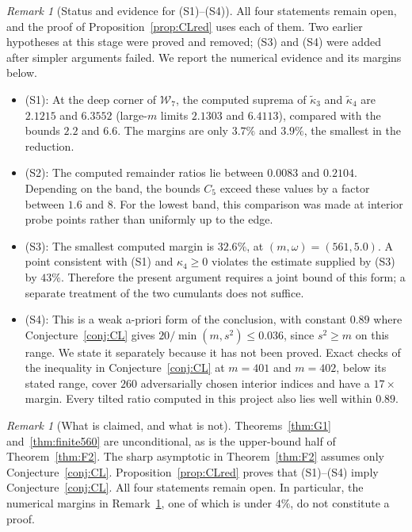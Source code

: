 \documentclass[11pt]{amsart}
\theoremstyle{plain}
\theoremstyle{definition}
\theoremstyle{remark}
\newtheorem{remark}[theorem]{Remark}
\begin{document}
\begin{remark}[Status and evidence for (S1)--(S4)]
\label{rem:S-evidence}
All four statements remain open, and the proof of
Proposition~\ref{prop:CLred} uses each of them. Two earlier hypotheses at
this stage were proved and removed; (S3) and (S4) were added after simpler
arguments failed. We report the numerical evidence and its margins below.
\begin{itemize}
\item (S1): At the deep corner of $\mathcal W_7$, the computed suprema of
$\tilde\kappa_3$ and $\tilde\kappa_4$ are $2.1215$ and $6.3552$
(large-$m$ limits $2.1303$ and $6.4113$), compared with the bounds $2.2$
and $6.6$. The margins are only $3.7\%$ and $3.9\%$, the smallest in the
reduction.
\item (S2): The computed remainder ratios lie between $0.0083$ and
$0.2104$. Depending on the band, the bounds $C_5$ exceed these values by
a factor between $1.6$ and $8$. For the lowest band, this comparison was
made at interior probe points rather than uniformly up to the edge.
\item (S3): The smallest computed margin is $32.6\%$, at
$(m,\omega)=(561,5.0)$. A point consistent with (S1) and
$\kappa_4\ge0$ violates the estimate supplied by (S3) by $43\%$.
Therefore the present argument requires a joint bound of this form; a
separate treatment of the two cumulants does not suffice.
\item (S4): This is a weak a-priori form of the conclusion, with constant
$0.89$ where Conjecture~\ref{conj:CL} gives
$20/\min(m,s^2)\le0.036$, since $s^2\ge m$ on this range. We state it
separately because it has not been proved. Exact checks of the inequality
in Conjecture~\ref{conj:CL} at $m=401$ and $m=402$, below its stated
range, cover $260$ adversarially chosen interior indices and have a
$17\times$ margin. Every tilted ratio computed in this project also lies
well within $0.89$.
\end{itemize}
\end{remark}

\begin{remark}[What is claimed, and what is not]
Theorems~\ref{thm:G1} and~\ref{thm:finite560} are unconditional, as is the
upper-bound half of Theorem~\ref{thm:F2}. The sharp asymptotic in
Theorem~\ref{thm:F2} assumes only Conjecture~\ref{conj:CL}.
Proposition~\ref{prop:CLred} proves that (S1)--(S4) imply
Conjecture~\ref{conj:CL}. All four statements remain open. In particular,
the numerical margins in Remark~\ref{rem:S-evidence}, one of which is
under $4\%$, do not constitute a proof.
\end{remark}
\end{document}
